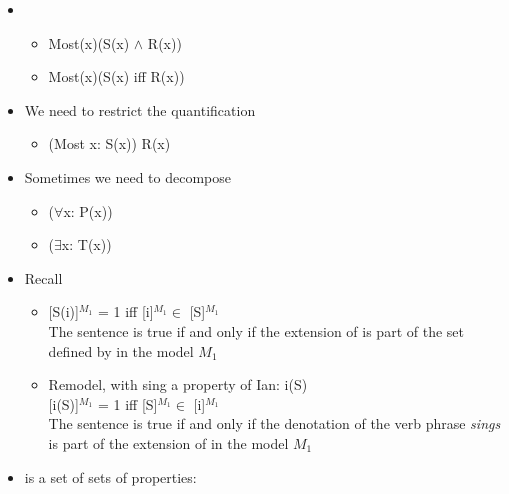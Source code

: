 \documentclass[headrule,footrule]{foils}
\begin{document}

\begin{itemize}
\item {}
  \begin{itemize}
  \item Most(x)(S(x) $\wedge$ R(x))
    \\ 
  \item Most(x)(S(x) iff R(x))
    \\ 
  \end{itemize}
\item We need to restrict the quantification
  \begin{itemize}
  \item (Most x: S(x)) R(x)
  \end{itemize}
\item Sometimes we need to decompose
  \begin{itemize}
  \item {} ($\forall$x: P(x))
  \item {} ($\exists$x: T(x))
  \end{itemize}
\end{itemize}

 \begin{itemize}
\item Recall  
  \begin{itemize}
  \item {[S(i)]$^{M_1}$ = 1 iff [i]$^{M_1} \in$ [S]$^{M_1}$} \\ The
    sentence is true if and only if the extension of  is part of
    the set defined by  in the model $M_1$
  \item Remodel, with sing a property of Ian: i(S) \\ {[i(S)]$^{M_1}$
      = 1 iff [S]$^{M_1} \in$ [i]$^{M_1}$} \\ The sentence is true if
    and only if the denotation of the verb phrase \textit{sings} is
    part of the extension of   in the model $M_1$
  \end{itemize}
\item {} is a set of sets of properties: 
\end{itemize}

\end{document}
